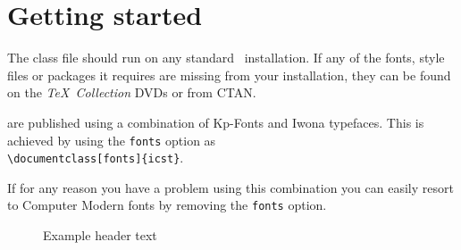 \documentclass[fonts]{icst}
\begin{document}
\section{Getting started}
The \textsf{\journalclassshort} class file should run
on any standard \LaTeXe\ installation. If any of the fonts, style
files or packages it requires are missing from your installation,
they can be found on the \emph{\TeX\ Collection} DVDs or from
CTAN.

\emph{\journalnamelc} are published using a combination of Kp-Fonts
and Iwona typefaces. This is achieved by using the \verb"fonts"
option as\\
\verb"\documentclass[fonts]{icst}".

\noindent If for any reason you have a problem using this
combination you can easily resort to Computer Modern fonts by
removing the \verb"fonts" option.

\begin{figure*}
\setlength{\fboxsep}{0pt}%
\setlength{\fboxrule}{0pt}%
\begin{center}
\end{center}
\caption{Example header text\label{F1}}
\end{figure*}
\end{document}

